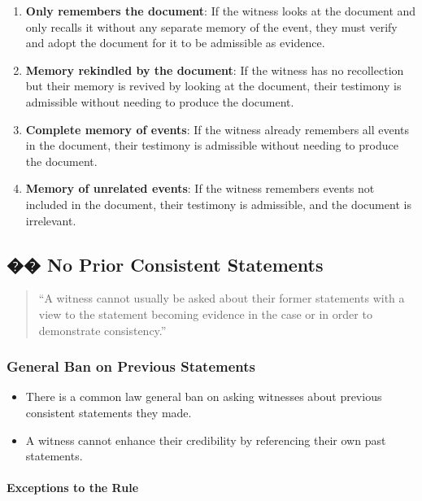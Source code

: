 \begin{enumerate}
\def\labelenumi{\arabic{enumi}.}
\tightlist
\item
  \textbf{Only remembers the document}: If the witness looks at the
  document and only recalls it without any separate memory of the event,
  they must verify and adopt the document for it to be admissible as
  evidence.
\item
  \textbf{Memory rekindled by the document}: If the witness has no
  recollection but their memory is revived by looking at the document,
  their testimony is admissible without needing to produce the document.
\item
  \textbf{Complete memory of events}: If the witness already remembers
  all events in the document, their testimony is admissible without
  needing to produce the document.
\item
  \textbf{Memory of unrelated events}: If the witness remembers events
  not included in the document, their testimony is admissible, and the
  document is irrelevant.
\end{enumerate}

\subsection{�� No Prior Consistent
Statements}\label{no-prior-consistent-statements}

\begin{quote}
``A witness cannot usually be asked about their former statements with a
view to the statement becoming evidence in the case or in order to
demonstrate consistency.''
\end{quote}

\subsubsection{General Ban on Previous
Statements}\label{general-ban-on-previous-statements}

\begin{itemize}
\tightlist
\item
  There is a common law general ban on asking witnesses about previous
  consistent statements they made.
\item
  A witness cannot enhance their credibility by referencing their own
  past statements.
\end{itemize}

\paragraph{Exceptions to the Rule}\label{exceptions-to-the-rule}


